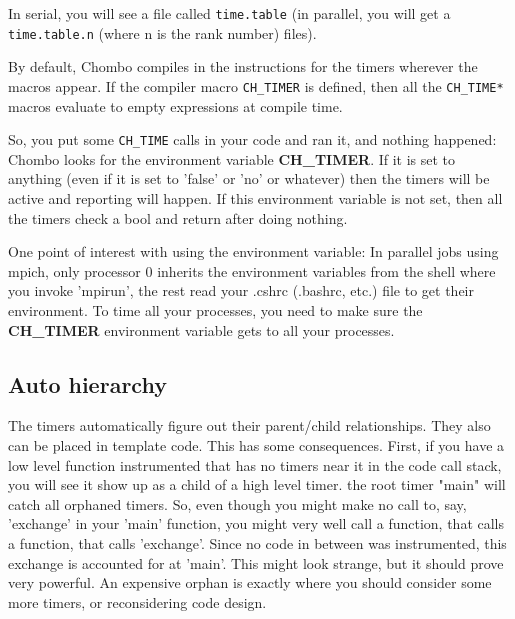      In serial, you will see a file called {\tt time.table} (in parallel, you will get a 
     {\tt time.table.n} (where n is the rank number) files).  
   
     By default, Chombo compiles in the instructions for the timers wherever the macros
     appear.  
     If the compiler macro \verb|CH_TIMER| is defined,
      then all the \verb|CH_TIME*| macros
     evaluate to empty expressions at compile time.

     So, you put some \verb|CH_TIME| calls in your code and ran it, and nothing happened:
     Chombo looks for the environment variable {\bf CH\_TIMER}. If it is set to anything (even
     if it is set to 'false' or 'no' or whatever) then the timers will be active and
     reporting will happen.  If this environment variable is not set, then all the timers
     check a bool and return after doing nothing.
     
     One point of interest with using the environment variable: In parallel jobs using
     mpich, only processor 0 inherits the environment variables from the shell where
     you invoke 'mpirun', the rest read your .cshrc (.bashrc, etc.) file to get their
     environment.  To time all your processes, you need to make sure the {\bf CH\_TIMER} 
     environment variable gets to all your processes.

 

    \subsection{Auto hierarchy}

     The timers automatically figure out their parent/child relationships.  They
     also can be placed in template code.  This has some consequences.  First,
     if you have a low level function instrumented that has no timers near it in
     the code call stack, you will see it show up as a child of a high level timer.
     the root timer "main" will catch all orphaned timers.  So, even though you
     might make no call to, say, 'exchange' in your 'main' function, you might
     very well call a function, that calls a function, that calls 'exchange'. Since
     no code in between was instrumented, this exchange is accounted for at 'main'.
     This might look strange, but it should prove very powerful. An expensive orphan
     is exactly where you should consider some more timers, or reconsidering code
     design.

